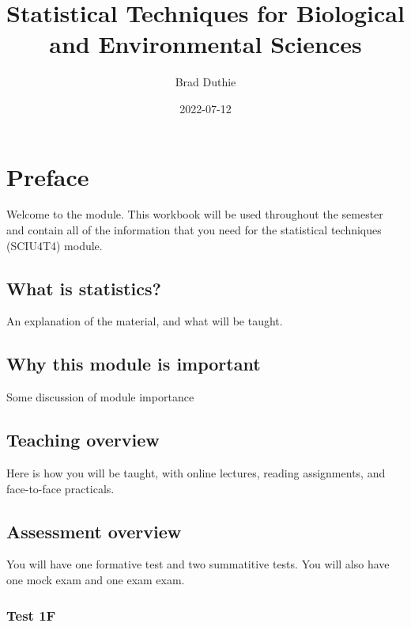 \documentclass[
]{book}
\title{Statistical Techniques for Biological and Environmental Sciences}
\author{Brad Duthie}
\date{2022-07-12}
\begin{document}
\maketitle

{
\setcounter{tocdepth}{1}
\tableofcontents
}
\hypertarget{preface}{%
\chapter*{Preface}\label{preface}}

Welcome to the module. This workbook will be used throughout the semester and contain all of the information that you need for the statistical techniques (SCIU4T4) module.

\hypertarget{what-is-statistics}{%
\section{What is statistics?}\label{what-is-statistics}}

An explanation of the material, and what will be taught.

\hypertarget{why-this-module-is-important}{%
\section{Why this module is important}\label{why-this-module-is-important}}

Some discussion of module importance

\hypertarget{teaching-overview}{%
\section{Teaching overview}\label{teaching-overview}}

Here is how you will be taught, with online lectures, reading assignments, and face-to-face practicals.

\hypertarget{assessment-overview}{%
\section{Assessment overview}\label{assessment-overview}}

You will have one formative test and two summatitive tests. You will also have one mock exam and one exam exam.

\hypertarget{test-1f}{%
\subsection{Test 1F}\label{test-1f}}
\end{document}
